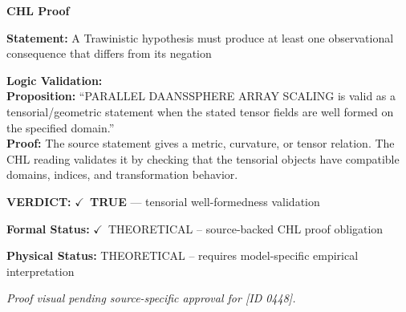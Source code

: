 \vspace{0.45em}
\noindent\textbf{CHL Proof}\par
\textbf{Statement:} A Trawinistic hypothesis must produce at least one observational consequence that
differs from its negation

\textbf{Logic Validation:}\\
\textbf{Proposition:} ``PARALLEL DAANSSPHERE ARRAY SCALING is valid as a tensorial/geometric statement when the
stated tensor fields are well formed on the specified domain.''\\
\textbf{Proof:} The source statement gives a metric, curvature, or tensor relation. The CHL reading
validates it by checking that the tensorial objects have compatible domains, indices,
and transformation behavior.

\textbf{VERDICT:} \ensuremath{\checkmark}\ \textbf{TRUE} --- tensorial well-formedness validation

\textbf{Formal Status:} \ensuremath{\checkmark}\ THEORETICAL -- source-backed CHL proof obligation

\textbf{Physical Status:} THEORETICAL -- requires model-specific empirical interpretation
\par\vspace{0.45em}
\par
\vfill
\begingroup\footnotesize\itshape
Proof visual pending source-specific approval for [ID 0448].
\par\endgroup
\vfill
\endgroup
\endgroup
